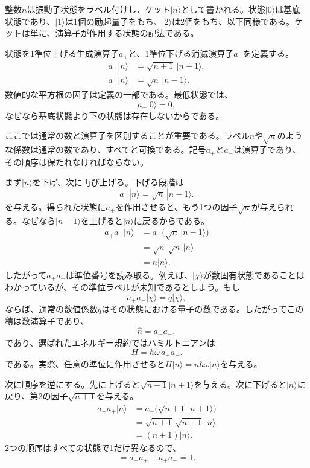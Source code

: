 整数\(n\)は振動子状態をラベル付けし、ケット\(|n\rangle\)として書かれる。状態\(|0\rangle\)は基底状態であり、\(|1\rangle\)は1個の励起量子をもち、\(|2\rangle\)は2個をもち、以下同様である。ケットは単に、演算子が作用する状態の記法である。

状態を1準位上げる生成演算子\(a_+\)と、1準位下げる消滅演算子\(a_-\)を定義する。
\begin{align}
a_+|n\rangle &= \sqrt{n+1}\,|n+1\rangle,\\
a_-|n\rangle &= \sqrt{n}\,|n-1\rangle.
\end{align}
数値的な平方根の因子は定義の一部である。最低状態では、
\begin{equation}
a_-|0\rangle=0,
\end{equation}
なぜなら基底状態より下の状態は存在しないからである。

ここでは通常の数と演算子を区別することが重要である。ラベル\(n\)や\(\sqrt n\)のような係数は通常の数であり、すべてと可換である。記号\(a_+\)と\(a_-\)は演算子であり、その順序は保たれなければならない。

まず\(|n\rangle\)を下げ、次に再び上げる。下げる段階は
\begin{equation}
a_-|n\rangle=\sqrt n\,|n-1\rangle.
\end{equation}
を与える。得られた状態に\(a_+\)を作用させると、もう1つの因子\(\sqrt n\)が与えられる。なぜなら\(|n-1\rangle\)を上げると\(|n\rangle\)に戻るからである。
\begin{align}
a_+a_-|n\rangle
&=a_+\bigl(\sqrt n\,|n-1\rangle\bigr)\\
&=\sqrt n\,\sqrt n\,|n\rangle\\
&=n|n\rangle.
\end{align}
したがって\(a_+a_-\)は準位番号を読み取る。例えば、\(|\chi\rangle\)が数固有状態であることはわかっているが、その準位ラベルが未知であるとしよう。もし
\begin{equation}
a_+a_-|\chi\rangle=q|\chi\rangle,
\end{equation}
ならば、通常の数値係数\(q\)はその状態における量子の数である。したがってこの積は数演算子であり、
\begin{equation}
\hat n=a_+a_-,
\end{equation}
であり、選ばれたエネルギー規約ではハミルトニアンは
\begin{equation}
H=\hbar\omega\,a_+a_-.
\end{equation}
である。実際、任意の準位に作用させると\(H|n\rangle=n\hbar\omega|n\rangle\)を与える。

次に順序を逆にする。先に上げると\(\sqrt{n+1}|n+1\rangle\)を与える。次に下げると\(|n\rangle\)に戻り、第2の因子\(\sqrt{n+1}\)を与える。
\begin{align}
a_-a_+|n\rangle
&=a_-\bigl(\sqrt{n+1}\,|n+1\rangle\bigr)\\
&=\sqrt{n+1}\,\sqrt{n+1}\,|n\rangle\\
&=(n+1)|n\rangle.
\end{align}
2つの順序はすべての状態で1だけ異なるので、
\begin{equation}
[a_-,a_+]=a_-a_+-a_+a_-=1.
\end{equation}

